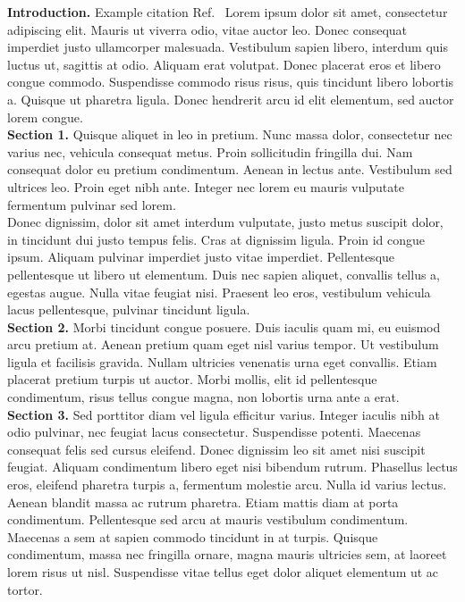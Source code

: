 \noindent \textbf{Introduction.} Example citation Ref.~\cite{example}
Lorem ipsum dolor sit amet, consectetur adipiscing elit. Mauris ut viverra odio, vitae auctor leo. Donec consequat imperdiet justo ullamcorper malesuada. Vestibulum sapien libero, interdum quis luctus ut, sagittis at odio. Aliquam erat volutpat. Donec placerat eros et libero congue commodo. Suspendisse commodo risus risus, quis tincidunt libero lobortis a. Quisque ut pharetra ligula. Donec hendrerit arcu id elit elementum, sed auctor lorem congue.\\

\noindent \textbf{Section 1.}
Quisque aliquet in leo in pretium. Nunc massa dolor, consectetur nec varius nec, vehicula consequat metus. Proin sollicitudin fringilla dui. Nam consequat dolor eu pretium condimentum. Aenean in lectus ante. Vestibulum sed ultrices leo. Proin eget nibh ante. Integer nec lorem eu mauris vulputate fermentum pulvinar sed lorem.\\

Donec dignissim, dolor sit amet interdum vulputate, justo metus suscipit dolor, in tincidunt dui justo tempus felis. Cras at dignissim ligula. Proin id congue ipsum. Aliquam pulvinar imperdiet justo vitae imperdiet. Pellentesque pellentesque ut libero ut elementum. Duis nec sapien aliquet, convallis tellus a, egestas augue. Nulla vitae feugiat nisi. Praesent leo eros, vestibulum vehicula lacus pellentesque, pulvinar tincidunt ligula.\\

\noindent \textbf{Section 2.} 
Morbi tincidunt congue posuere. Duis iaculis quam mi, eu euismod arcu pretium at. Aenean pretium quam eget nisl varius tempor. Ut vestibulum ligula et facilisis gravida. Nullam ultricies venenatis urna eget convallis. Etiam placerat pretium turpis ut auctor. Morbi mollis, elit id pellentesque condimentum, risus tellus congue magna, non lobortis urna ante a erat.\\

\noindent \textbf{Section 3.} 
Sed porttitor diam vel ligula efficitur varius. Integer iaculis nibh at odio pulvinar, nec feugiat lacus consectetur. Suspendisse potenti. Maecenas consequat felis sed cursus eleifend. Donec dignissim leo sit amet nisi suscipit feugiat. Aliquam condimentum libero eget nisi bibendum rutrum. Phasellus lectus eros, eleifend pharetra turpis a, fermentum molestie arcu. Nulla id varius lectus. Aenean blandit massa ac rutrum pharetra. Etiam mattis diam at porta condimentum. Pellentesque sed arcu at mauris vestibulum condimentum. Maecenas a sem at sapien commodo tincidunt in at turpis. Quisque condimentum, massa nec fringilla ornare, magna mauris ultricies sem, at laoreet lorem risus ut nisl. Suspendisse vitae tellus eget dolor aliquet elementum ut ac tortor.\\

